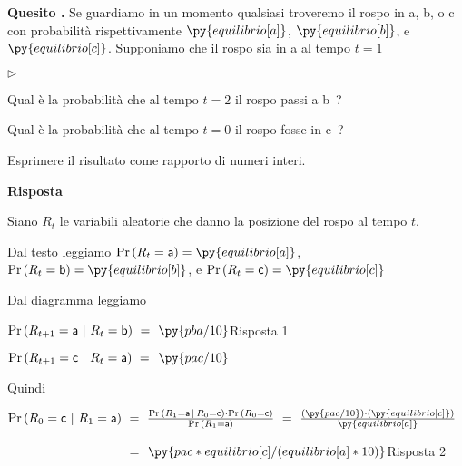 \documentclass[11pt,twoside,a4paper]{article}
\newcommand{\mylabel}[1]{#1\hfill}
\renewenvironment{itemize}
  {\begin{list}{$\triangleright$}{%
   \setlength{\parskip}{0mm}
   \setlength{\topsep}{.4\baselineskip}
   \setlength{\rightmargin}{0mm}
   \setlength{\listparindent}{0mm}
   \setlength{\itemindent}{0mm}
   \setlength{\labelwidth}{2ex}
   \setlength{\itemsep}{.4\baselineskip}
   \setlength{\parsep}{0mm}
   \setlength{\partopsep}{0mm}
   \setlength{\labelsep}{1ex}
   \setlength{\leftmargin}{\labelwidth+\labelsep}
   \let\makelabel\mylabel}}{%
   \end{list}\vspace*{-1.3mm}}
\def\Pr{{\rm Pr\,}}
\newcounter{quesito}
\newenvironment{question}{\bigskip\addtocounter{quesito}{1}\par\textbf{Quesito \thequesito.}}{\vspace{\parskip}}
\newenvironment{answer}{\par\textbf{Risposta\quad}}{\vspace{\parskip}}
\begin{document}
\begin{question}
Se guardiamo in un momento qualsiasi troveremo il rospo in {\sf a}, {\sf b}, o {\sf c} con probabilità rispettivamente $\py{equilibrio[a]}$, $\py{equilibrio[b]}$, e $\py{equilibrio[c]}$. Supponiamo che il rospo sia in {\sf a} al tempo $t=1$ 

\begin{itemize}
\item[1.] Qual è la probabilità che al tempo $t=2$ il rospo passi a {\sf b}~?

\item[2.] Qual è la probabilità che al tempo $t=0$ il rospo fosse in {\sf c}~?
\end{itemize}

Esprimere il risultato come rapporto di numeri interi.

\begin{answer}

Siano $R_t$ le variabili aleatorie che danno la posizione del rospo al tempo $t$.

Dal testo leggiamo $\Pr(R_t={\sf a})=\py{equilibrio[a]}$, $\Pr(R_t={\sf b})=\py{equilibrio[b]}$, e $\Pr(R_t={\sf c})=\py{equilibrio[c]}$

Dal diagramma leggiamo 

$\Pr(R_{t+1}={\sf a}~|~R_t={\sf b})\ =\kern1.2ex${\color{blue}$\py{pba/10}$\hfill Risposta 1}

$\Pr(R_{t+1}={\sf c}~|~R_t={\sf a})\ =\kern1ex\py{pac/10}$

Quindi

$\Pr(R_0={\sf c}~|~R_1={\sf a})
\ =\ \frac{\Pr(R_1={\sf a}\,|\,R_0={\sf c})\cdot\Pr(R_0={\sf c})}{\Pr(R_1={\sf a})}
\ =\ \frac{(\py{pac/10})\cdot(\py{equilibrio[c]})}{\py{equilibrio[a]}}$

$\phantom{\Pr(R_0={\sf c}~|~R_1={\sf a})}
\ =\kern1.2ex${\color{blue}$\py{pac*equilibrio[c]/(equilibrio[a]*10)}$\hfill Risposta 2}

\end{answer}



\end{question}
\end{document}
